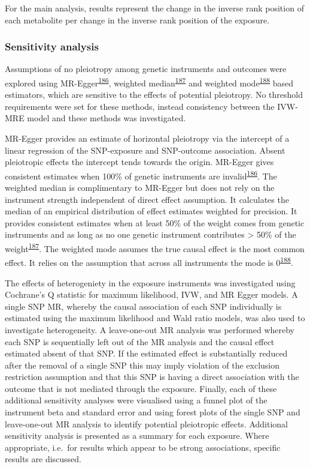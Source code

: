 \documentclass[11pt,twoside]{bristolthesis}
\begin{document}
For the main analysis, results represent the change in the inverse rank position of each metabolite per change in the inverse rank position of the exposure.

\hypertarget{sensitivity-analysis}{%
\subsubsection{Sensitivity analysis}\label{sensitivity-analysis}}

Assumptions of no pleiotropy among genetic instruments and outcomes were explored using MR-Egger\textsuperscript{\protect\hyperlink{ref-Bowden2015a}{186}}, weighted median\textsuperscript{\protect\hyperlink{ref-Burgess2017a}{187}} and weighted mode\textsuperscript{\protect\hyperlink{ref-Hartwig2017}{188}} based estimators, which are sensitive to the effects of potential pleiotropy. No threshold requirements were set for these methods, instead consistency between the IVW-MRE model and these methods was investigated.

MR-Egger provides an estimate of horizontal pleiotropy via the intercept of a linear regression of the SNP-exposure and SNP-outcome association. Absent pleiotropic effects the intercept tends towards the origin. MR-Egger gives consistent estimates when 100\% of genetic instruments are invalid\textsuperscript{\protect\hyperlink{ref-Bowden2015a}{186}}. The weighted median is complimentary to MR-Egger but does not rely on the instrument strength independent of direct effect assumption. It calculates the median of an empirical distribution of effect estimates weighted for precision. It provides consistent estimates when at least 50\% of the weight comes from genetic instruments and as long as no one genetic instrument contributes \textgreater{} 50\% of the weight\textsuperscript{\protect\hyperlink{ref-Burgess2017a}{187}}. The weighted mode assumes the true causal effect is the most common effect. It relies on the assumption that across all instruments the mode is 0\textsuperscript{\protect\hyperlink{ref-Hartwig2017}{188}}.

The effects of heterogeniety in the exposure instruments was investigated using Cochrane's Q statistic for maximum likelihood, IVW, and MR Egger models. A single SNP MR, whereby the causal association of each SNP individually is estimated using the maximum likelihood and Wald ratio models, was also used to investigate heterogeneity. A leave-one-out MR analysis was performed whereby each SNP is sequentially left out of the MR analysis and the causal effect estimated absent of that SNP. If the estimated effect is substantially reduced after the removal of a single SNP this may imply violation of the exclusion restriction assumption and that this SNP is having a direct association with the outcome that is not mediated through the exposure. Finally, each of these additional sensitivity analyses were visualised using a funnel plot of the instrument beta and standard error and using forest plots of the single SNP and leave-one-out MR analysis to identify potential pleiotropic effects. Additional sensitivity analysis is presented as a summary for each exposure. Where appropriate, i.e.~for results which appear to be strong associations, specific results are discussed.
\end{document}
